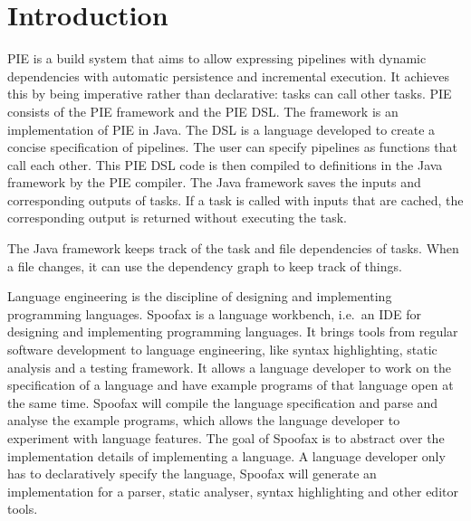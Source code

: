 
\chapter{\label{chap:introduction}Introduction}


\Ac{PIE} is a build system that aims to allow expressing pipelines with dynamic dependencies with automatic persistence and incremental execution.
It achieves this by being imperative rather than declarative: tasks can call other tasks.
\Ac{PIE} consists of the PIE framework and the \ac{PIE} \ac{DSL}.
The framework is an implementation of \ac{PIE} in Java.
The \ac{DSL} is a language developed to create a concise specification of pipelines.
The user can specify pipelines as functions that call each other.
This \ac{PIE} \ac{DSL} code is then compiled to definitions in the Java framework by the \ac{PIE} compiler.
The Java framework saves the inputs and corresponding outputs of tasks.
If a task is called with inputs that are cached, the corresponding output is returned without executing the task.

The Java framework keeps track of the task and file dependencies of tasks.
When a file changes, it can use the dependency graph to keep track of things.



Language engineering is the discipline of designing and implementing programming languages.
Spoofax is a language workbench, i.e.\ an IDE for designing and implementing programming languages.
It brings tools from regular software development to language engineering, like syntax highlighting, static analysis and a testing framework.
It allows a language developer to work on the specification of a language and have example programs of that language open at the same time.
Spoofax will compile the language specification and parse and analyse the example programs, which allows the language developer to experiment with language features.
The goal of Spoofax is to abstract over the implementation details of implementing a language.
A language developer only has to declaratively specify the language, Spoofax will generate an implementation for a parser, static analyser, syntax highlighting and other editor tools.

